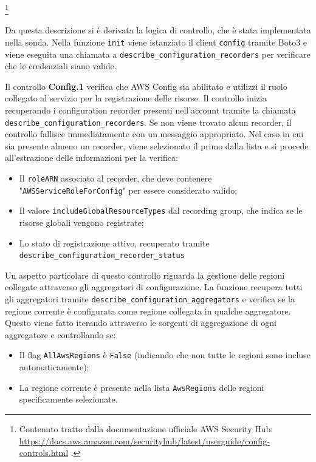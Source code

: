 \footnote{Contenuto tratto dalla documentazione ufficiale AWS Security Hub: \url{https://docs.aws.amazon.com/securityhub/latest/userguide/config-controls.html} .}

Da questa descrizione si è derivata la logica di controllo, che è stata implementata nella sonda. Nella funzione \texttt{init} viene istanziato il client \texttt{config} tramite Boto3 e viene eseguita una chiamata a \texttt{describe\_configuration\_recorders} per verificare che le credenziali siano valide.

Il controllo \textbf{Config.1} verifica che AWS Config sia abilitato e utilizzi il ruolo collegato al servizio per la registrazione delle risorse.  Il controllo inizia recuperando i configuration recorder presenti nell'account tramite la chiamata \texttt{describe\_configuration\_recorders}. Se non viene trovato alcun recorder, il controllo fallisce immediatamente con un messaggio appropriato. Nel caso in cui sia presente almeno un recorder, viene selezionato il primo dalla lista e si procede all'estrazione delle informazioni per la verifica:
\begin{itemize}
\item Il \texttt{roleARN} associato al recorder, che deve contenere "\texttt{AWSServiceRoleForConfig}" per essere considerato valido;
\item Il valore \texttt{includeGlobalResourceTypes} dal recording group, che indica se le risorse globali vengono registrate;
\item Lo stato di registrazione attivo, recuperato tramite \texttt{describe\_configuration\_recorder\_status}
\end{itemize}

Un aspetto particolare di questo controllo riguarda la gestione delle regioni collegate attraverso gli aggregatori di configurazione. La funzione recupera tutti gli aggregatori tramite \texttt{describe\_configuration\_aggregators} e verifica se la regione corrente è configurata come regione collegata in qualche aggregatore. Questo viene fatto iterando attraverso le sorgenti di aggregazione di ogni aggregatore e controllando se:
\begin{itemize}
\item Il flag \texttt{AllAwsRegions} è \texttt{False} (indicando che non tutte le regioni sono incluse automaticamente);
\item La regione corrente è presente nella lista \texttt{AwsRegions} delle regioni specificamente selezionate.
\end{itemize}

